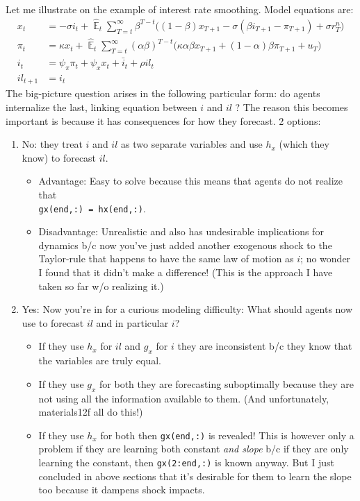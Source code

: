 \documentclass[11pt]{article}
\renewcommand{\[}{\begin{equation}}
\renewcommand{\]}{\end{equation}}
\DeclareMathOperator{\E}{\mathbb{E}}
\begin{document}
Let me illustrate on the example of interest rate smoothing. Model equations are:
\begin{align*}
x_t &=  -\sigma i_t +\hat{\E}_t \sum_{T=t}^{\infty} \beta^{T-t }\big( (1-\beta)x_{T+1} - \sigma(\beta i_{T+1} - \pi_{T+1}) +\sigma r_T^n \big)   \\
\pi_t &= \kappa x_t +\hat{\E}_t \sum_{T=t}^{\infty} (\alpha\beta)^{T-t }\big( \kappa \alpha \beta x_{T+1} + (1-\alpha)\beta \pi_{T+1} + u_T\big)  \\
i_t &= \psi_{\pi}\pi_t + \psi_{x} x_t   + \bar{i}_t + \rho il_t \\
il_{t+1} & = i_t 
\end{align*}
The big-picture question arises in the following particular form: do agents internalize the last, linking equation between $i$ and $il$ ?
The reason this becomes important is because it has consequences for how they forecast. 2 options:
\begin{enumerate}
\item No: they treat $i$ and $il$ as two separate variables and use $h_x$ (which they know) to forecast $ il $.
\begin{itemize}
\item Advantage: Easy to solve because this means that agents do not realize that \\ \texttt{gx(end,:) = hx(end,:)}.
\item Disadvantage: Unrealistic and also has undesirable implications for dynamics b/c now you've just added another exogenous shock to the Taylor-rule that happens to have the same law of motion as $i$; no wonder I found that it didn't make a difference! (This is the approach I have taken so far w/o realizing it.)
\end{itemize}
\item Yes: Now you're in for a curious modeling difficulty: What should agents now use to forecast $il$ and in particular $i$?
\begin{itemize}
\item If they use $h_x$ for $il$ and $g_x$ for $i$ they are inconsistent b/c they know that the variables are truly equal.
\item If they use $g_x$ for both they are forecasting suboptimally because they are not using all the information available to them. (And unfortunately, materials12f all do this!)
\item If they use $h_x$ for both then \texttt{gx(end,:)} is revealed! This is however only a problem if they are learning both constant \emph{and slope} b/c if they are only learning the constant, then  \texttt{gx(2:end,:)} is known anyway. But I just concluded in above sections that it's desirable for them to learn the slope too because it dampens shock impacts.
\end{itemize}

\end{enumerate}
\end{document}
